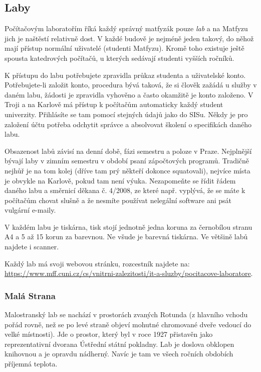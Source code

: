 \subsection{Laby}
Počítačovým laboratořím říká každý správný matfyzák pouze \textit{lab} a na
Matfyzu jich je naštěstí relativně dost. V každé budově je nejméně jeden takový,
do něhož mají přístup normální uživatelé (studenti Matfyzu).
Kromě toho existuje ještě spousta katedrových počítačů, u kterých sedávají
studenti vyšších ročníků.

K přístupu do labu potřebujete zpravidla průkaz studenta a uživatelské konto.
Potřebujete-li založit konto, procedura bývá taková, že si člověk zažádá u
služby v daném labu, žádosti je zpravidla vyhověno a často okamžitě je konto
založeno. V Troji a na Karlově má přístup k počítačům automaticky každý student
univerzity. Přihlásíte se tam pomocí stejných údajů jako do SISu. Někdy je pro
založení účtu potřeba odchytit správce a absolvovat školení o specifikách daného
labu.

Obsazenost labů závisí na denní době, fázi semestru a poloze v Praze. Nejplnější
bývají laby v zimním semestru v období psaní zápočtových programů. Tradičně
nejhůř je na tom kolej (dříve tam prý někteří dokonce squatovali), nejvíce místa
je obvykle na Karlově, pokud tam není výuka. Nezapomeňte se řídit řádem daného labu a
směrnicí děkana č. 4/2008, ze které např. vyplývá, že se máte k počítačům chovat
slušně a že nesmíte používat nelegální software ani psát vulgární e-maily.

V každém labu je tiskárna, tisk stojí jednotně jedna koruna za černobílou stranu
A4 a 5 až 15 korun za barevnou. Ne všude je barevná tiskárna. Ve většině labů
najdete i scanner.

Každý lab má svoji webovou stránku, rozcestník najdete na: \url{https://www.mff.cuni.cz/cs/vnitrni-zalezitosti/it-a-sluzby/pocitacove-laboratore}.


\subsubsection{Malá Strana}
Malostranský lab se nachází v prostorách zvaných Rotunda (z hlavního vchodu
pořád rovně, než se po levé straně objeví mohutné chromované dveře vedoucí do
velké místnosti). Jde o prostor, který byl v roce 1927 přistavěn jako
reprezentativní dvorana Ústřední státní pokladny. Lab je doslova obklopen
knihovnou a je opravdu nádherný. Navíc je tam ve všech ročních obdobích příjemná
teplota.

